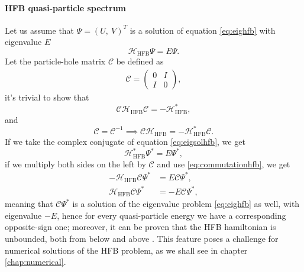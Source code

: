 \paragraph{HFB quasi-particle spectrum} Let us assume that $\Psi = (U,\  V )^T$ is a solution of equation \eqref{eq:eighfb} with eigenvalue $E$
\begin{equation}
    \label{eq:eigsolhfb}
    \mathcal H_\text{HFB}\Psi = E\Psi.
\end{equation}
Let the particle-hole matrix $\mathcal C$ be defined as
\begin{align}
    \mathcal C = \begin{pmatrix}
        0 & I \\ I&0
    \end{pmatrix},
\end{align}
it's trivial to show that 
\begin{equation}
    \label{eq:hfb_anticomm}
    \mathcal C \mathcal H_\text{HFB} \mathcal C = -\mathcal H_\text{HFB}^*,
\end{equation}
and 
\begin{equation}
    \label{eq:commutationhfb}
    \mathcal C = \mathcal C ^{-1}\implies \mathcal C\mathcal H_\text{HFB} = -\mathcal H_\text{HFB}^*\mathcal C.
\end{equation}
If we take the complex conjugate of equation \eqref{eq:eigsolhfb}, we get
\begin{equation}
    \label{eq:eigsolhfb_conj}
    \mathcal H_\text{HFB}^*\Psi ^* = E\Psi^*,
\end{equation}
if we multiply both sides on the left by $\mathcal C$ and use \eqref{eq:commutationhfb}, we get
\begin{align}
    -\mathcal H_\text{HFB}\mathcal C\Psi ^* &= E\mathcal C\Psi^*,\\
    \mathcal H_\text{HFB}\mathcal C\Psi ^* &= -E\mathcal C\Psi^*,
\end{align}
meaning that $\mathcal C \Psi^*$ is a solution of the eigenvalue problem \eqref{eq:eighfb} as well, with eigenvalue $-E$, hence for every quasi-particle energy we have a corresponding opposite-sign one; moreover, it can be proven that the HFB hamiltonian is unbounded, both from below and above \cite{Pei2012_HFBcontinuum}. This feature poses a challenge for numerical solutions of the HFB problem, as we shall see in chapter \ref{chap:numerical}.



